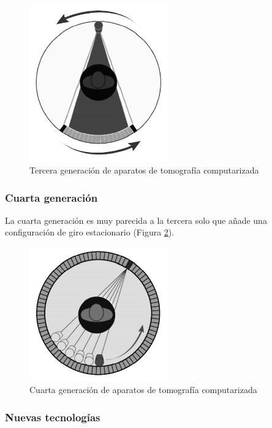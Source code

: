 \begin{figure}[H]
	\centering
	\includegraphics[width=6cm]{imagenes/introduccion/tercera-generacion}
	\caption{Tercera generación de aparatos de tomografía computarizada \cite{historia-tomografia}}
	\label{fig:introduccion/tercera-generacion}
\end{figure}

\subsubsection{Cuarta generación}

La cuarta generación es muy parecida a la tercera solo que añade una configuración de giro estacionario (Figura \ref{fig:introduccion/cuarta-generacion}).

\begin{figure}[H]
	\centering
	\includegraphics[width=6cm]{imagenes/introduccion/cuarta-generacion}
	\caption{Cuarta generación de aparatos de tomografía computarizada \cite{historia-tomografia}}
	\label{fig:introduccion/cuarta-generacion}
\end{figure}

\subsubsection{Nuevas tecnologías}

